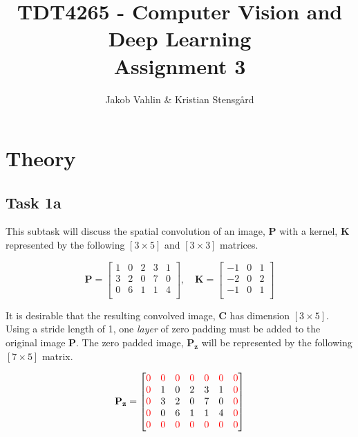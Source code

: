 \documentclass{article}
\date{}
\title{TDT4265 - Computer Vision and Deep Learning \\Assignment 3}
\author{Jakob Vahlin & Kristian Stensgård}
\begin{document}
\maketitle

\tableofcontents
\newpage

\section{Theory}

\subsection{Task 1a}

This subtask will discuss the spatial convolution of  an image, $\mathbf{P}$ with a kernel, $\mathbf{K}$ represented by the following $[3 \times5]$ and $[3\times3]$ matrices.

\begin{equation}
    \mathbf{P} = \begin{bmatrix}
        1 & 0& 2 & 3 & 1\\
          3 & 2& 0 & 7 & 0\\
         0 & 6& 1 & 1 & 4 \\
    \end{bmatrix}, \quad
    \mathbf{K} = \begin{bmatrix}
    -1 & 0 & 1 \\
    -2 &0& 2 \\
    -1 &0& 1 \\
    \end{bmatrix}
    \label{eq:image}
\end{equation}

It is desirable that the resulting convolved image, $\mathbf{C}$ has dimension $[3\times5]$. Using a stride length of 1, one \textit{layer} of zero padding must be added to the original image $\mathbf{P}$. The zero padded image, $\mathbf{P_z}$ will be represented by the following $[7\times5]$ matrix.  

\begin{equation}\def\r{\color{red}}\def\b{\color{blue}}
    \mathbf{P_z} = \begin{bmatrix}
    \r0 &\r0&\r0&\r0&\r0&\r0&\r0 \\
     \r 0&  1 & 0& 2 & 3 & 1&\r0\\
     \r 0&    3 & 2& 0 & 7 & 0&\r0\\
      \r0&   0 & 6& 1 & 1 & 4&\r0 \\
      \r0&\r0&\r0&\r0&\r0&\r0&\r0\\
    \end{bmatrix}
\end{equation}
\end{document}
